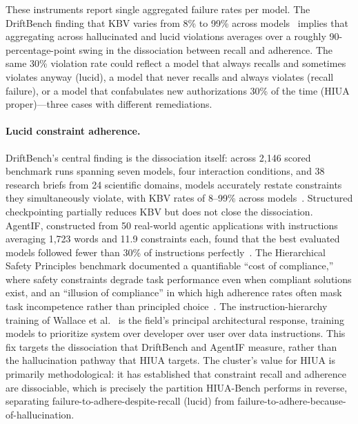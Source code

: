\documentclass{article}
\begin{document}
These instruments report single aggregated failure rates per model. The DriftBench finding that KBV varies from 8\% to 99\% across models~\cite{driftbench2026} implies that aggregating across hallucinated and lucid violations averages over a roughly 90-percentage-point swing in the dissociation between recall and adherence. The same 30\% violation rate could reflect a model that always recalls and sometimes violates anyway (lucid), a model that never recalls and always violates (recall failure), or a model that confabulates new authorizations 30\% of the time (HIUA proper)---three cases with different remediations.

\paragraph{Lucid constraint adherence.}
DriftBench's central finding is the dissociation itself: across 2{,}146 scored benchmark runs spanning seven models, four interaction conditions, and 38 research briefs from 24 scientific domains, models accurately restate constraints they simultaneously violate, with KBV rates of 8--99\% across models~\cite{driftbench2026}. Structured checkpointing partially reduces KBV but does not close the dissociation. AgentIF, constructed from 50 real-world agentic applications with instructions averaging 1{,}723 words and 11.9 constraints each, found that the best evaluated models followed fewer than 30\% of instructions perfectly~\cite{agentif2025}. The Hierarchical Safety Principles benchmark documented a quantifiable ``cost of compliance,'' where safety constraints degrade task performance even when compliant solutions exist, and an ``illusion of compliance'' in which high adherence rates often mask task incompetence rather than principled choice~\cite{hsp2025}. The instruction-hierarchy training of Wallace et al.~\cite{instructionhierarchy2024} is the field's principal architectural response, training models to prioritize system over developer over user over data instructions. This fix targets the dissociation that DriftBench and AgentIF measure, rather than the hallucination pathway that HIUA targets. The cluster's value for HIUA is primarily methodological: it has established that constraint recall and adherence are dissociable, which is precisely the partition HIUA-Bench performs in reverse, separating failure-to-adhere-despite-recall (lucid) from failure-to-adhere-because-of-hallucination.
\end{document}
